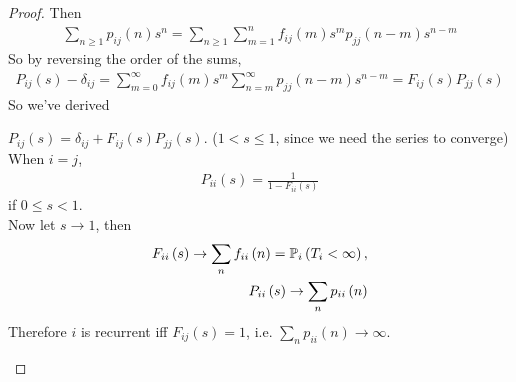 \documentclass[a4paper]{article}
\begin{document}
\begin{thm}
\begin{proof}
Then
\begin{equation*}
\begin{aligned}
\sum_{n\geq 1} p_{ij}\left(n\right)s^n = \sum_{n\geq 1} \sum_{m=1}^n f_{ij}\left(m\right)s^m p_{jj}\left(n-m\right)s^{n-m}
\end{aligned}
\end{equation*}
So by reversing the order of the sums,
\begin{equation*}
\begin{aligned}
P_{ij}\left(s\right) - \delta_{ij} = \sum_{m=0}^\infty f_{ij}\left(m\right) s^m \sum_{n=m}^\infty p_{jj}\left(n-m\right)s^{n-m} = F_{ij}\left(s\right)P_{jj}\left(s\right)
\end{aligned}
\end{equation*}
So we've derived
\begin{thm}
$P_{ij}\left(s\right) = \delta_{ij} + F_{ij}\left(s\right)P_{jj}\left(s\right)$. ($1 < s \leq 1$, since we need the series to converge)\\
When $i=j$,
\begin{equation*}
\begin{aligned}
P_{ii}\left(s\right) = \frac{1}{1-F_{ii}\left(s\right)}
\end{aligned}
\end{equation*}
if $0\leq s < 1$.\\
Now let $s \to 1$, then
\begin{equation*}
\begin{aligned}
F_{ii}\left(s\right) \to \sum_n f_{ii}\left(n\right) = \P_i\left(T_i < \infty\right),\\
P_{ii}\left(s\right) \to \sum_n p_{ii}\left(n\right)
\end{aligned}
\end{equation*}
Therefore $i$ is recurrent iff $F_{ij}\left(s\right) = 1$, i.e. $\sum_n p_{ii}\left(n\right) \to \infty$.
\end{thm}
\end{proof}
\end{thm}
\end{document}
